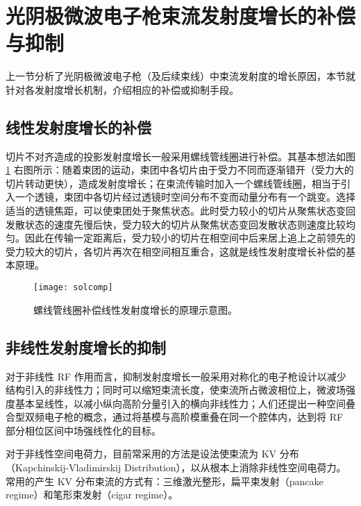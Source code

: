 \section{光阴极微波电子枪束流发射度增长的补偿与抑制}
上一节分析了光阴极微波电子枪（及后续束线）中束流发射度的增长原因，本节就针对各发射度增长机制，介绍相应的补偿或抑制手段。

\subsection{线性发射度增长的补偿}
切片不对齐造成的投影发射度增长一般采用螺线管线圈进行补偿。其基本想法如图 \ref{fig:solcomp} 右图所示：随着束团的运动，束团中各切片由于受力不同而逐渐错开（受力大的切片转动更快），造成发射度增长；在束流传输时加入一个螺线管线圈，相当于引入一个透镜，束团中各切片经过透镜时空间分布不变而动量分布有一个跳变。选择适当的透镜焦距，可以使束团处于聚焦状态。此时受力较小的切片从聚焦状态变回发散状态的速度先慢后快，受力较大的切片从聚焦状态变回发散状态则速度比较均匀。因此在传输一定距离后，受力较小的切片在相空间中后来居上追上之前领先的受力较大的切片，各切片再次在相空间相互重合，这就是线性发射度增长补偿的基本原理\cite{Anderson:2002ab}。
\begin{figure}[htbp]
\centering
\texttt{[image: solcomp]}
\caption{\label{fig:solcomp} 螺线管线圈补偿线性发射度增长的原理示意图\cite{Anderson:2002ab}。}
\end{figure}

\subsection{非线性发射度增长的抑制}
对于非线性 RF 作用而言，抑制发射度增长一般采用对称化的电子枪设计以减少结构引入的非线性力；同时可以缩短束流长度，使束流所占微波相位上，微波场强度基本呈线性，以减小纵向高阶分量引入的横向非线性力；人们还提出一种空间叠合型双频电子枪的概念，通过将基模与高阶模重叠在同一个腔体内，达到将 RF 部分相位区间中场强线性化的目标。

对于非线性空间电荷力，目前常采用的方法是设法使束流为 KV 分布（Kapchinskij-Vladimirskij Distribution）\cite{Kapchinskij:1959aa}，以从根本上消除非线性空间电荷力。常用的产生 KV 分布束流的方式有：三维激光整形，扁平束发射（pancake regime）和笔形束发射（cigar regime）。

